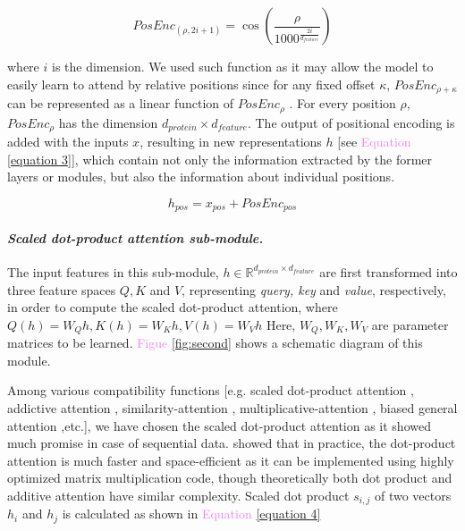 \documentclass[11 pt, a4paper]{article}
\begin{document}
\begin{multicols}{2}
\begin{equation}
     PosEnc_{(\rho,2i+1)} = \cos(\frac{\rho}{1000^\frac{2i}{d_{feature}}})
      \label{equation 2}
\end{equation}

where $i$ is the dimension. We used such function as it may 
allow the model to easily learn to attend by relative
positions since for any fixed offset $\kappa$, 
$PosEnc_{\rho+\kappa}$ can be represented as a linear
function of $PosEnc_\rho$ \cite{Vaswani}. For every position 
$\rho$, $PosEnc_\rho$ has the dimension $d_{protein} \times
d_{feature}$. The output of positional encoding is
added with the inputs $x$, resulting in new representations
$h$ [see \textcolor{violet}{Equation} \ref{equation 3}],
which contain not only the information extracted by
the former layers or modules, but also the information about
individual positions.

\begin{equation}
    h_{pos} = x_{pos} + PosEnc_{pos}
    \label{equation 3}
\end{equation}

\paragraph{\textit{Scaled dot-product attention sub-module.}}
The input features in this sub-module,
$h \in  \mathbb{R}^{d_{protein} \times d_{feature}}$
are first transformed into three feature spaces $Q,K$ and
$V$, representing \textit{query, key} and \textit{value},
respectively, in order to compute the scaled dot-product
attention, where $Q(h) = W_Qh, K(h) = W_Kh, V(h) = W_Vh$
Here, $W_Q, W_K, W_V $ are parameter matrices to be learned.
\textcolor{violet}{Figue} \ref{fig:second} shows a schematic 
diagram of this module. \par
Among various compatibility functions [e.g. scaled dot-product
attention \cite{Vaswani}, addictive attention \cite{Bahdanau},
similarity-attention \cite{Graves}, multiplicative-attention
\cite{Luong}, biased general attention \cite{Sordoni},etc.],
we have chosen the scaled dot-product attention
as it showed much promise in case of sequential data.
\cite{Vaswani} showed that in practice, the dot-product 
attention is much faster and space-efficient as it can be 
implemented using highly optimized matrix multiplication 
code, though theoretically both dot product and additive 
attention have similar complexity. Scaled dot product
$s_{i,j}$ of two vectors $h_i$ and $h_j$ is calculated as 
shown in \textcolor{violet}{Equation} \ref{equation 4}


\end{multicols}
\end{document}
